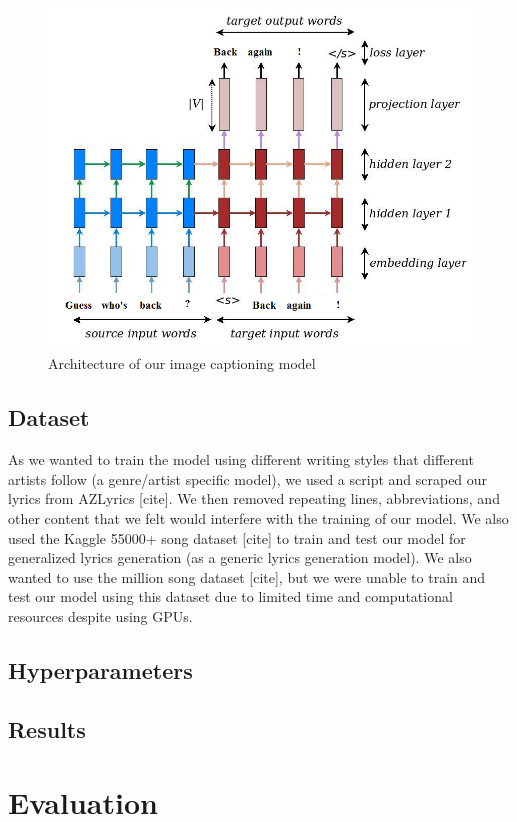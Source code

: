 \documentclass{article}
\begin{document}
\begin{figure}[!ht]
\centering
\includegraphics[scale=0.35]{5.png}
\caption{Architecture of our image captioning model}
\label{fig:5}
\end{figure}
\subsection{Dataset}

As we wanted to train the model using different writing styles that different artists follow (a genre/artist specific model), we used a script and scraped our lyrics from AZLyrics [cite]. We then removed repeating lines, abbreviations, and other content that we felt would interfere with the training of our model. We also used the Kaggle 55000+ song dataset [cite] to train and test our model for generalized lyrics generation (as a generic lyrics generation model). We also wanted to use the million song dataset [cite], but we were unable to train and test our model using this dataset due to limited time and computational resources despite using GPUs.

\subsection{Hyperparameters}

\subsection{Results}

\section{Evaluation}
\label{sec:4}
\end{document}
